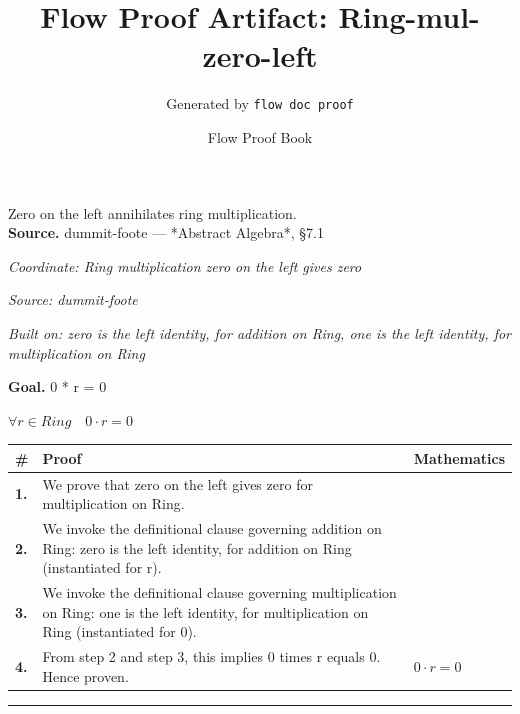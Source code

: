 \documentclass[11pt]{article}
\title{Flow Proof Artifact: Ring-mul-zero-left}
\author{Generated by \texttt{flow doc proof}}
\date{Flow Proof Book}
\theoremstyle{definition}
\begin{document}
\maketitle
Zero on the left annihilates ring multiplication.\\[0.5em]
\textbf{Source.} dummit-foote — *Abstract Algebra*, §7.1\\[0.5em]
\bigskip
{}\par
\smallskip\noindent\textit{Coordinate: Ring \cdot multiplication \cdot zero on the left gives zero}\par
\smallskip\noindent\textit{Source: dummit-foote}\par
\smallskip\noindent\textit{Built on: zero is the left identity, for addition on Ring, one is the left identity, for multiplication on Ring}\par
\medskip
\noindent\textbf{Goal.} 0 * r = 0\par
\noindent$\displaystyle \forall r \in Ring\quad 0 \cdot r = 0$\par
\medskip
\noindent
\begin{tabular}{@{} >{\raggedright\arraybackslash}p{} >{\raggedright\arraybackslash}p{} >{\raggedleft\arraybackslash}p{} @{}}
\textbf{\#} & \textbf{Proof} & \textbf{Mathematics} \\
\midrule
\textbf{1.} & We prove that zero on the left gives zero for multiplication on Ring. & \\[0.45em]
\textbf{2.} & We invoke the definitional clause governing addition on Ring: zero is the left identity, for addition on Ring (instantiated for r). & \\[0.45em]
\textbf{3.} & We invoke the definitional clause governing multiplication on Ring: one is the left identity, for multiplication on Ring (instantiated for 0). & \\[0.45em]
\textbf{4.} & From step 2 and step 3, this implies 0 times r equals 0. Hence proven. & $\displaystyle 0 \cdot r = 0$ \\[0.45em]
\bottomrule
\end{tabular}
\label{thm:Ring-multiplication-zero_on_the_left_gives_zero}
\par\medskip\hrule
\end{document}
